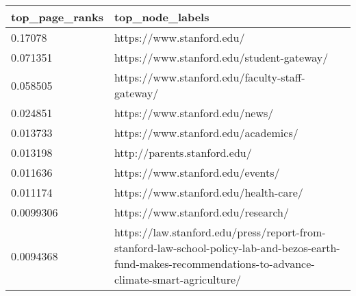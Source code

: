 \begin{tabular}{ll}
top_page_ranks & top_node_labels \\ 
\hline 
0.17078 & https://www.stanford.edu/ \\ 
0.071351 & https://www.stanford.edu/student-gateway/ \\ 
0.058505 & https://www.stanford.edu/faculty-staff-gateway/ \\ 
0.024851 & https://www.stanford.edu/news/ \\ 
0.013733 & https://www.stanford.edu/academics/ \\ 
0.013198 & http://parents.stanford.edu/ \\ 
0.011636 & https://www.stanford.edu/events/ \\ 
0.011174 & https://www.stanford.edu/health-care/ \\ 
0.0099306 & https://www.stanford.edu/research/ \\ 
0.0094368 & https://law.stanford.edu/press/report-from-stanford-law-school-policy-lab-and-bezos-earth-fund-makes-recommendations-to-advance-climate-smart-agriculture/ \\ 
\hline 
\end{tabular}